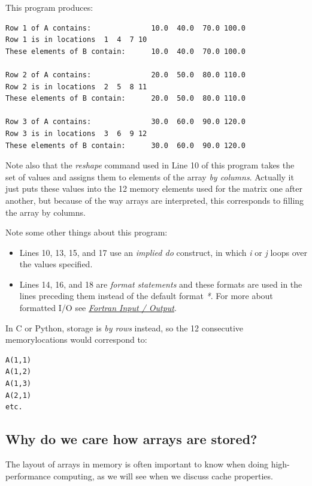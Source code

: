 \documentclass[letterpaper,10pt,english]{sphinxmanual}
\begin{document}
This program produces:

\begin{Verbatim}[commandchars=\\\{\}]
Row 1 of A contains:              10.0  40.0  70.0 100.0
Row 1 is in locations  1  4  7 10
These elements of B contain:      10.0  40.0  70.0 100.0

Row 2 of A contains:              20.0  50.0  80.0 110.0
Row 2 is in locations  2  5  8 11
These elements of B contain:      20.0  50.0  80.0 110.0

Row 3 of A contains:              30.0  60.0  90.0 120.0
Row 3 is in locations  3  6  9 12
These elements of B contain:      30.0  60.0  90.0 120.0
\end{Verbatim}

Note also that the \emph{reshape} command used in Line 10 of this program takes
the set of values and assigns them to elements of the array \emph{by columns}.
Actually it just puts these values into the 12 memory elements used for the
matrix one after another, but because of the way arrays are interpreted,
this corresponds to filling the array by columns.

Note some other things about this program:
\begin{itemize}
\item {} 
Lines 10, 13, 15, and 17 use an \emph{implied do} construct, in which \emph{i} or \emph{j}
loops over the values specified.

\item {} 
Lines 14, 16, and 18 are \emph{format statements} and these formats are used
in the lines preceding them instead of the default format \emph{*}.
For more about formatted I/O see {\hyperref[fortran_io:fortran-io]{\emph{Fortran Input / Output}}}.

\end{itemize}

In C or Python, storage is \emph{by rows} instead, so the 12 consecutive
memorylocations would correspond to:

\begin{Verbatim}[commandchars=\\\{\}]
A(1,1)
A(1,2)
A(1,3)
A(2,1)
etc.
\end{Verbatim}


\subsection{Why do we care how arrays are stored?}
\label{fortran_arrays:why-do-we-care-how-arrays-are-stored}
The layout of arrays in memory
is often important to know when doing high-performance computing, as we
will see when we discuss cache properties.
\end{document}

